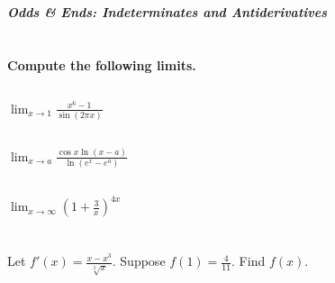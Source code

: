 \documentclass[english]{article}
\newcommand{\prob}[1]{\setcounter{section}{#1-1}\section{}}
\newcommand{\prt}[1]{\setcounter{subsection}{#1-1}\subsection{}}
\theoremstyle{remark}
\theoremstyle{definition}
\newcommand{\ild}[1]{\displaystyle{#1}}
\begin{document}
%	
	\newpage

	\begin{center}{\Large\textbf{\emph{Odds \& Ends: Indeterminates and Antiderivatives}}}\end{center}
	\prob{12} \textbf{Compute the following limits.}
	\prt{1}$\ild{\lim_{x\to 1}\frac{x^6-1}{\sin(2\pi x)}}$\vspace{3.5in}
	\prt{2}$\ild{\lim_{x\to a}\frac{\cos x \ln (x-a)}{\ln(e^x-e^a)}}$\newpage
	\prt{3} $\ild{\lim_{x\to \infty} \left(1+\frac{3}{x}\right)^{4x}}$\vspace{3in}
	\prob{13} Let $ f'(x)=\ild{\frac{x-x^3}{\sqrt[3]{x}}}$. Suppose $f(1)=\frac{4}{11}$. Find $f(x)$.
	
\end{document}
